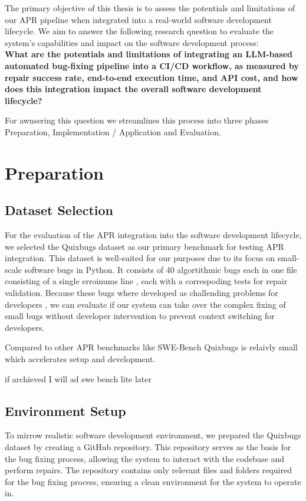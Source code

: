 The primary objective of this thesis is to assess the potentials and limitations of our APR pipeline when integrated into a real-world software development lifecycle. We aim to answer the following research question to evaluate the system's capabilities and impact on the software development process: \\
\textbf{What are the potentials and limitations of integrating an LLM-based automated bug-fixing pipeline into a CI/CD workflow, as measured by repair success rate, end-to-end execution time, and API cost, and how does this integration impact the overall software development lifecycle?}

For awnsering this question we streamlines this process into three phases Preparation, Implementation / Application and Evaluation.



\section{Preparation}
\subsection{Dataset Selection}
For the evaluation of the APR integration into the software development lifecycle, we selected the Quixbugs dataset \cite{linQuixBugsMultilingualProgram2017} as our primary benchmark for testing APR integration. This dataset is well-suited for our purposes due to its focus on small-scale software bugs in Python. It consists of 40 algortithmic bugs each in one file consisting of a single erroinums line , each with a correspoding tests for repair validation. Because these bugs where developed as challending problems for developers \cite{linQuixBugsMultilingualProgram2017}, we can evaluate if our system can take over the complex fixing of small bugs without developer intervention to prevent context switching for developers.

Compared to other APR benchmarks like SWE-Bench \cite{jimenezSWEbenchCanLanguage2024} Quixbugs is relaivly small which accelerates setup and development.

if archieved I will ad swe bench lite later \cite{jimenezSWEbenchCanLanguage2024}

\subsection{Environment Setup}
To mirrow realistic software development environment, we prepared the Quixbugs dataset by creating a GitHub repository. This repository serves as the basis for the bug fixing process, allowing the system to interact with the codebase and perform repairs. The repository contains only relevant files and folders required for the bug fixing process, ensuring a clean environment for the system to operate in.

